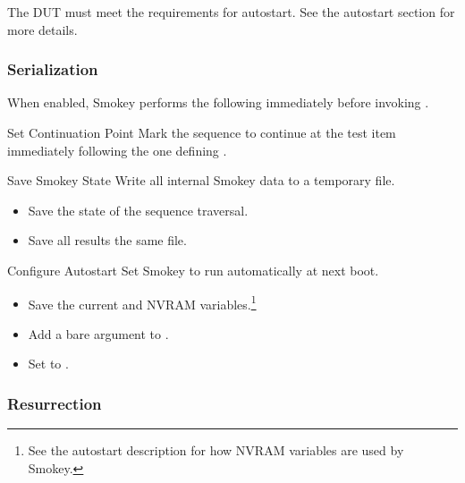 The DUT must meet the requirements for autostart.  See the autostart section
for more details.

\subsubsection{Serialization}

When enabled, Smokey performs the following immediately before invoking
.

\begin{Definition}

\item[Set Continuation Point] Mark the sequence to continue at the test item
immediately following the one defining .

\item[Save Smokey State] Write all internal Smokey data to a temporary file.

	\begin{itemize}

	\item Save the state of the sequence traversal.

	\item Save all results the same file.

	\end{itemize}

\item[Configure Autostart] Set Smokey to run automatically at next boot.

	\begin{itemize}

	\item Save the current  and  NVRAM
	variables.\footnote{See the autostart description for how NVRAM
	variables are used by Smokey.}

	\item Add a bare  argument to .

	\item Set  to .

	\end{itemize}

\end{Definition}

\subsubsection{Resurrection}

